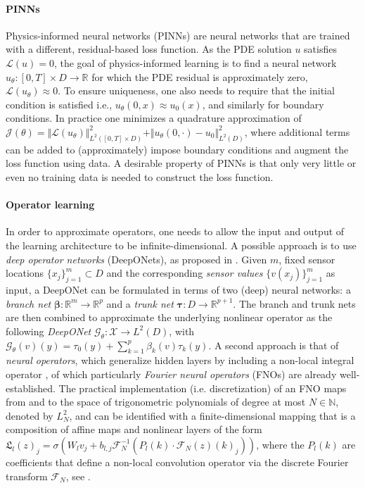 \documentclass{article}
\numberwithin{equation}{section}
\newcommand{\R}{\mathbb{R}}
\newcommand{\N}{\mathbb{N}}
\newcommand{\cF}{\mathcal{F}}
\newcommand{\cG}{\mathcal{G}}
\newcommand{\cJ}{\mathcal{J}}
\newcommand{\cL}{\mathcal{L}}
\newcommand{\cX}{\mathcal{X}}
\renewcommand{\tr}{{{\tau}}}
\newcommand{\trunk}{{\bm{\tau}}}
\newcommand{\branch}{{\bm{\beta}}}
\newcommand{\1}{\mathbbm{1}}
\begin{document}
\paragraph{PINNs}\label{sec:prel-pinn} Physics-informed neural networks (PINNs) are neural networks that are trained with a different, residual-based loss function. As the PDE solution $u$ satisfies $\cL(u)=0$, the goal of physics-informed learning is to find a neural network $u_\theta:[0,T]\times D\to \R$ for which the PDE residual is approximately zero, $\cL(u_\theta)\approx 0$. To ensure uniqueness, one also needs to require that the initial condition is satisfied i.e., $u_\theta(0,x) \approx u_0(x)$, and similarly for boundary conditions. In practice one minimizes a quadrature approximation of $\cJ(\theta) =\Vert\cL(u_\theta)\Vert_{L^2([0,T]\times D)}^2+\Vert u_\theta(0,\cdot)-u_0\Vert_{L^2(D)}^2$,
where additional terms can be added to (approximately) impose boundary conditions and augment the loss function using data. A desirable property of PINNs is that only very little or even no training data is needed to construct the loss function. 

\paragraph{Operator learning}\label{sec:prel-deeponets}

In order to approximate operators, one needs to allow the input and output of the learning architecture to be infinite-dimensional. A possible approach is to use \emph{deep operator networks} (DeepONets), as proposed in \cite{ChenChen1995, deeponets}. 
Given $m$, fixed sensor locations $\{x_j\}_{j=1}^m \subset D$ and the corresponding \emph{sensor values} $\{v(x_j)\}_{j=1}^m$ as input,
a DeepONet can be formulated in terms of two (deep) neural networks: a \emph{branch net} $\branch: \R^m \to \R^{p}$ and a \emph{trunk net} $\trunk :D\to\R^{p+1}$.
The branch and trunk nets are then combined to approximate the underlying nonlinear operator as the following \emph{DeepONet} $\cG_\theta:\cX \to L^2(D)$, with $\cG_\theta(v)(y) = \tr_0(y)+\sum_{k=1}^p \beta_k(v) \tr_k(y)$. A second approach is that of \emph{neural operators}, which generalize hidden layers by including a non-local integral operator \cite{GKO}, of which particularly \emph{Fourier neural operators} (FNOs) \cite{FNO} are already well-established. The practical implementation (i.e. discretization) of an FNO maps from and to the space of trigonometric polynomials of degree at most $N\in\N$, denoted by $L^2_N$, and can be identified with a finite-dimensional mapping that is a composition of affine maps and nonlinear layers of the form $\mathfrak{L}_l(z)_j = \sigma(W_l v_j + b_{l,j}
\cF^{-1}_N(P_l(k)\cdot \cF_N(z)(k)_j))$, where the $P_l(k)$ are coefficients that define a non-local convolution operator via the discrete Fourier transform $\cF_N$, see \cite{kovachki2021universal}. 
\end{document}
